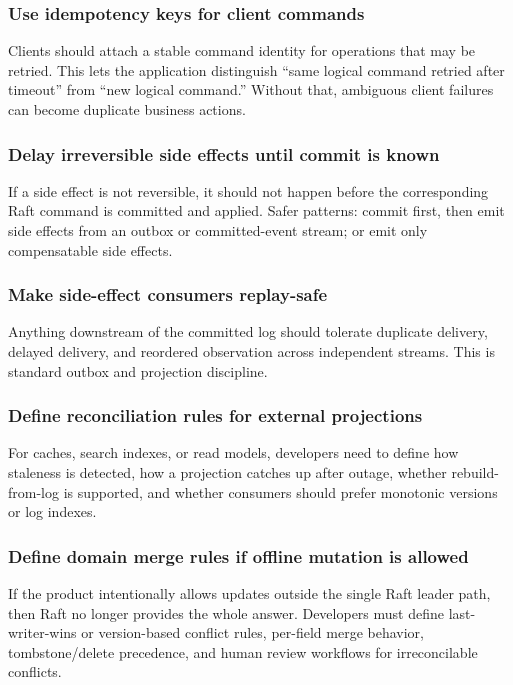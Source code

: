 \subsubsection{Use idempotency keys for client commands}

Clients should attach a stable command identity for operations that may
be retried. This lets the application distinguish ``same logical command
retried after timeout'' from ``new logical command.'' Without that,
ambiguous client failures can become duplicate business actions.

\subsubsection{Delay irreversible side effects until commit is known}

If a side effect is not reversible, it should not happen before the
corresponding Raft command is committed and applied. Safer patterns:
commit first, then emit side effects from an outbox or committed-event
stream; or emit only compensatable side effects.

\subsubsection{Make side-effect consumers replay-safe}

Anything downstream of the committed log should tolerate duplicate
delivery, delayed delivery, and reordered observation across independent
streams. This is standard outbox and projection discipline.

\subsubsection{Define reconciliation rules for external projections}

For caches, search indexes, or read models, developers need to define how
staleness is detected, how a projection catches up after outage, whether
rebuild-from-log is supported, and whether consumers should prefer
monotonic versions or log indexes.

\subsubsection{Define domain merge rules if offline mutation is allowed}

If the product intentionally allows updates outside the single Raft leader
path, then Raft no longer provides the whole answer. Developers must define
last-writer-wins or version-based conflict rules, per-field merge behavior,
tombstone/delete precedence, and human review workflows for irreconcilable
conflicts.

